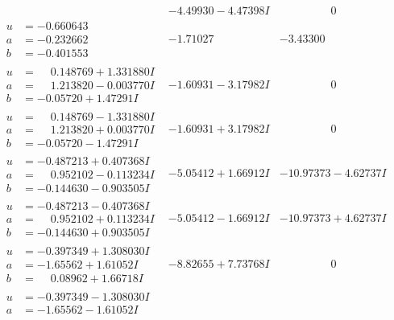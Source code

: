 \documentclass[1p]{elsarticle_modified}
\theoremstyle{definition}
\begin{document}
$$\begin{array}{c|c|c}
 & -4.49930 - 4.47398 I & \phantom{-0.000000 } 0 \\ \hline\begin{aligned}
u &= -0.660643\phantom{ +0.000000I} \\
a &= -0.232662\phantom{ +0.000000I} \\
b &= -0.401553\phantom{ +0.000000I}\end{aligned}
 & -1.71027\phantom{ +0.000000I} & -3.43300\phantom{ +0.000000I} \\ \hline\begin{aligned}
u &= \phantom{-}0.148769 + 1.331880 I \\
a &= \phantom{-}1.213820 - 0.003770 I \\
b &= -0.05720 + 1.47291 I\end{aligned}
 & -1.60931 - 3.17982 I & \phantom{-0.000000 } 0 \\ \hline\begin{aligned}
u &= \phantom{-}0.148769 - 1.331880 I \\
a &= \phantom{-}1.213820 + 0.003770 I \\
b &= -0.05720 - 1.47291 I\end{aligned}
 & -1.60931 + 3.17982 I & \phantom{-0.000000 } 0 \\ \hline\begin{aligned}
u &= -0.487213 + 0.407368 I \\
a &= \phantom{-}0.952102 - 0.113234 I \\
b &= -0.144630 - 0.903505 I\end{aligned}
 & -5.05412 + 1.66912 I & -10.97373 - 4.62737 I \\ \hline\begin{aligned}
u &= -0.487213 - 0.407368 I \\
a &= \phantom{-}0.952102 + 0.113234 I \\
b &= -0.144630 + 0.903505 I\end{aligned}
 & -5.05412 - 1.66912 I & -10.97373 + 4.62737 I \\ \hline\begin{aligned}
u &= -0.397349 + 1.308030 I \\
a &= -1.65562 + 1.61052 I \\
b &= \phantom{-}0.08962 + 1.66718 I\end{aligned}
 & -8.82655 + 7.73768 I & \phantom{-0.000000 } 0 \\ \hline\begin{aligned}
u &= -0.397349 - 1.308030 I \\
a &= -1.65562 - 1.61052 I \\

\end{aligned}
\end{array}$$
\end{document}

